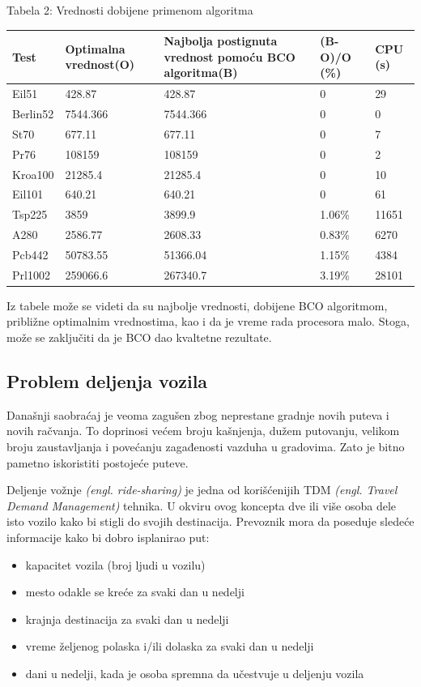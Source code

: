 \documentclass[a4paper]{article}
\begin{document}
{\begin{center}
Tabela 2: Vrednosti dobijene primenom algoritma \cite{test} 
\begin{tabular}{|p{1.2cm}|p{2cm}|p{2cm}|p{1.4cm}|p{1cm}|}
 \hline
Test & Optimalna vrednost(O) & Najbolja postignuta vrednost pomoću BCO algoritma(B)& (B-O)/O (\%) &CPU (s) \\ \hline
Eil51&428.87&428.87&0&29\\ \hline
Berlin52&7544.366&7544.366&0&0\\ \hline
St70&677.11&677.11&0&7\\ \hline
Pr76&108159&108159&0&2\\ \hline
Kroa100&21285.4&21285.4&0&10\\ \hline
Eil101&640.21&640.21&0&61\\ \hline
Tsp225&3859&3899.9&1.06\%&11651\\ \hline
A280&2586.77&2608.33&0.83\%&6270\\ \hline
Pcb442&50783.55&51366.04&1.15\%&4384\\ \hline
Prl1002&259066.6&267340.7&3.19\%&28101\\ \hline
\end{tabular}\par
\bigskip

\end{center}
Iz tabele može se videti da su najbolje vrednosti, dobijene BCO algoritmom, približne optimalnim vrednostima, kao i da je vreme rada procesora malo. Stoga, može se zaključiti da je BCO dao kvaltetne rezultate.

\subsection{Problem deljenja vozila}
\label{subsec:drugaprimena}
Današnji saobraćaj je veoma zagušen zbog neprestane gradnje novih puteva i novih račvanja. To doprinosi većem broju kašnjenja, dužem putovanju, velikom broju zaustavljanja i povećanju zagađenosti vazduha u gradovima. Zato je bitno pametno iskoristiti postojeće puteve. 

Deljenje vožnje {\em(engl. ride-sharing)} je jedna od korišćenijih TDM {\em (engl. Travel Demand Management)} tehnika. U okviru ovog koncepta dve ili više osoba dele isto vozilo kako bi stigli do svojih destinacija. Prevoznik mora da poseduje sledeće informacije kako bi dobro isplanirao put:
\begin{itemize}%
\setlength{\labelsep}{10pt}
       \item kapacitet vozila (broj ljudi u vozilu)
       \item mesto odakle se kreće za svaki dan u nedelji
       \item krajnja destinacija za svaki dan u nedelji
       \item vreme željenog polaska i/ili dolaska za svaki dan u nedelji
       \item dani u nedelji, kada je osoba spremna da učestvuje u deljenju vozila 
\end{itemize}

}
\end{document}
